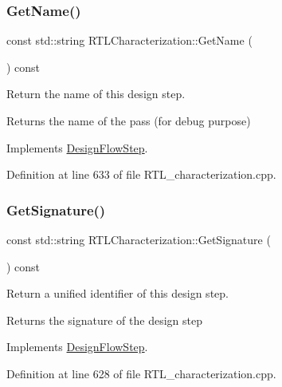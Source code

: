 \subsubsection{\texorpdfstring{Get\+Name()}{GetName()}}
{\footnotesize\ttfamily const std\+::string R\+T\+L\+Characterization\+::\+Get\+Name (\begin{DoxyParamCaption}{ }\end{DoxyParamCaption}) const\hspace{0.3cm}{\ttfamily [virtual]}}



Return the name of this design step. 

\begin{DoxyReturn}{Returns}
the name of the pass (for debug purpose) 
\end{DoxyReturn}


Implements \hyperlink{classDesignFlowStep_a01e5ebfab88db3b3b7f832f80075fad8}{Design\+Flow\+Step}.



Definition at line 633 of file R\+T\+L\+\_\+characterization.\+cpp.

\mbox{\label{classRTLCharacterization_a04f2b9b10118caba1e50a27769445f21}} 
\subsubsection{\texorpdfstring{Get\+Signature()}{GetSignature()}}
{\footnotesize\ttfamily const std\+::string R\+T\+L\+Characterization\+::\+Get\+Signature (\begin{DoxyParamCaption}{ }\end{DoxyParamCaption}) const\hspace{0.3cm}{\ttfamily [virtual]}}



Return a unified identifier of this design step. 

\begin{DoxyReturn}{Returns}
the signature of the design step 
\end{DoxyReturn}


Implements \hyperlink{classDesignFlowStep_ab111e3d4058615c2dedc0505978d4699}{Design\+Flow\+Step}.



Definition at line 628 of file R\+T\+L\+\_\+characterization.\+cpp.

